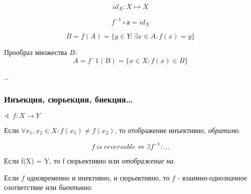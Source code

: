 \documentclass[12pt, a4paper]{article}
\begin{document}
  \begin{definition}
    \begin{equation}
      id_X: X \mapsto X
    \end{equation}
  \end{definition}

  \begin{equation}
  f^{-1} \circ а = id_X
  \end{equation}

  \begin{definition}[Образ]
  \begin{equation}
    B = f(A) = \{ y \in Y: \exists x \in A: f(x) = y\}
  \end{equation}
  \end{definition}

  \begin{definition}[Прообраз]
  Прообраз множества $B$:
  \begin{equation}
    A = f^-1(B) = \{x \in X: f(x) \in B \}
  \end{equation}  
  \end{definition}

  \begin{definition}[Композиция]
  \ldots
  \end{definition}

  \subsubsection{Инъекция, сюрьекция, биекция\ldots}
  $\sphericalangle ~~ f: X \longrightarrow Y$

  \begin{definition}
  Если $\forall x_1, x_2 \in X: f(x_1) \neq f(x_2)$, то отображение инъективно, \textit{обратимо}.
  \end{definition}

  \begin{definition}
  \begin{equation}
    f ~ is ~ reversable \Longleftrightarrow \exists f^{-1}: \ldots
  \end{equation}
  \end{definition}


  \begin{definition}
  Если f(X) = Y, то f сюрьективно или \textit{отображение на}.
  \end{definition}

  \begin{definition}
  Если $f$ одновременно и инективно, и сюрьективно, 
  то $f$ - взаимно-однозначное соответствие или \textit{биективно}.
  \end{definition}
\end{document}
